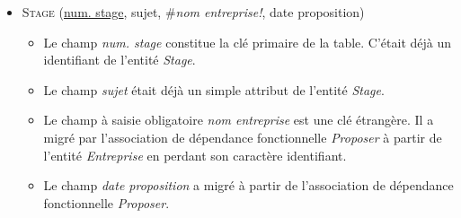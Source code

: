 \documentclass[a4paper]{article}
\newcommand{\relat}[1]{\textsc{#1}}
\newcommand{\attr}[1]{#1}
\newcommand{\prim}[1]{\uline{#1}}
\newcommand{\foreign}[1]{\#\textsl{#1}}
\begin{document}
\begin{itemize}
  \item \relat{Stage} (\prim{num. stage}, \attr{sujet}, \foreign{nom entreprise!}, \attr{date proposition})
  \begin{itemize}
    \item Le champ \emph{num. stage} constitue la clé primaire de la table. C'était déjà un identifiant de l'entité \emph{Stage}.
    \item Le champ \emph{sujet} était déjà un simple attribut de l'entité \emph{Stage}.
    \item Le champ à saisie obligatoire \emph{nom entreprise} est une clé étrangère. Il a migré par l'association de dépendance fonctionnelle \emph{Proposer} à partir de l'entité \emph{Entreprise} en perdant son caractère identifiant.
    \item Le champ \emph{date proposition} a migré à partir de l'association de dépendance fonctionnelle \emph{Proposer}.
  \end{itemize}

\end{itemize}
\end{document}
